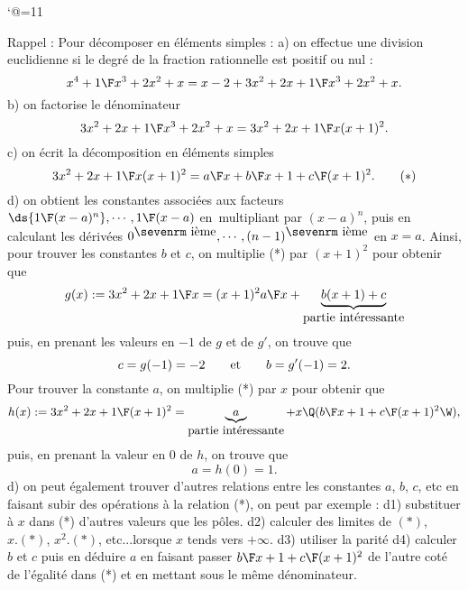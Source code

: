 \catcode`@=11\relax



\vglue-10mm
\bigskip\noindent
\vfill
Rappel : Pour décomposer en éléments simples : \pn
a) on  effectue une division euclidienne si le degré de la fraction rationnelle est positif ou nul : 
$$
{x^4+1\F x^3+2x^2+x}=x-2+{3x^2+2x+1\F x^3+2x^2+x}. 
$$
b) on factorise le dénominateur
$$
{3x^2+2x+1\F x^3+2x^2+x}={3x^2+2x+1\F x(x+1)^2}.
$$
c) on écrit la décomposition en éléments simples
$$
{3x^2+2x+1\F x(x+1)^2}={a\F x}+{b\F x+1}+{c\F(x+1)^2}.\qquad(*)
$$
d) on obtient les constantes associées aux facteurs $\ds {1\F (x-a)^n},\cdots, {1\F (x-a)}$ en~multipliant par $(x-a)^n$, puis en calculant les dérivées $0^{\hbox{\sevenrm ième}}, \cdots, (n-1)^{\hbox{\sevenrm ième}}$ en $x=a$. \pn
\bigskip
Ainsi, pour trouver les constantes $b$ et $c$, on multiplie (*) par $(x+1)^2$ pour obtenir que
$$
g(x):={3x^2+2x+1\F x}=(x+1)^2{a\F x}+\underbrace{b(x+1)+c}_{\hbox{partie intéressante}}
$$
puis, en prenant les valeurs en $-1$ de $g$ et de $g'$, on trouve que
$$
c=g(-1)=-2\qquad\hbox{et}\qquad b=g'(-1)=2.
$$ 
Pour trouver la constante $a$, on multiplie (*) par $x$ pour obtenir que
$$
h(x):={3x^2+2x+1\F (x+1)^2}=\underbrace{a}_{\hbox{partie intéressante}}+x\Q({b\F x+1}+{c\F(x+1)^2}\W),
$$
puis, en prenant la valeur en $0$ de $h$, on trouve que
$$
a= h(0)=1.
$$
d) on peut également trouver d'autres relations entre les constantes $a$, $b$, $c$, etc en faisant subir des opérations 
à la relation (*), on peut par exemple : \pn
d1) substituer  à $x$  dans (*) d'autres valeurs que les pôles. \pn
d2) calculer des limites de $(*)$, $x.(*)$, $x^2.(*)$, etc...lorsque $x$ tends vers $+\infty$. \pn
d3) utiliser la parité\pn
d4) calculer $b$ et $c$ puis en déduire $a$ en faisant passer ${b\F x+1}+{c\F(x+1)^2}$ 
de l'autre coté de l'égalité dans (*) et en mettant sous le même dénominateur.\pn
\eject


\vfill
{}
\vfill
{}
\vfill
{}
\vfill
{}
\bye
 